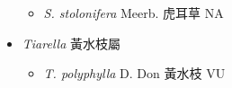 \begin{itemize}
  \begin{itemize}
        \item[] \textit{S. stolonifera} Meerb.  虎耳草   NA
  \end{itemize}
 \item[] \textit{Tiarella} 黃水枝屬
                                
  \begin{itemize}
        \item[] \textit{T. polyphylla} D. Don  黃水枝   VU
  \end{itemize}
  \end{itemize}
